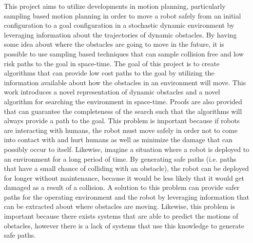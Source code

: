 This project aims to utilize developments in motion planning, particularly
sampling based motion planning in order to move a robot safely from an initial
configuration to a goal configuration in a stochastic dynamic environment by
leveraging information about the trajectories of dynamic obstacles. By having
some idea about where the obstacles are going to move in the future, it is
possible to use sampling based techniques that can sample collision free and
low risk paths to the goal in space-time. The goal of this project is to create
algorithms that can provide low cost paths to the goal by utilizing the
information available about how the obstacles in an environment will move. This
work introduces a novel representation of dynamic obstacles and a novel
algorithm for searching the environment in space-time.  Proofs are also
provided that can guarantee the completeness of the search such that the
algorithms will always provide a path to the goal. This problem is important
because if robots are interacting with humans, the robot must move safely in
order not to come into contact with and hurt humans as well as minimize the
damage that can possibly occur to itself. Likewise, imagine a situation where a
robot is deployed to an environment for a long period of time. By generating
safe paths (i.e. paths that have a small chance of colliding with an obstacle),
the robot can be deployed for longer without maintenance, because it would be
less likely that it would get damaged as a result of a collision. A solution to
this problem can provide safer paths for the operating environment and the
robot by leveraging information that can be extracted about where obstacles are
moving.  Likewise, this problem is important because there exists systems that
are able to predict the motions of obstacles, however there is a lack of
systems that use this knowledge to generate safe paths.


